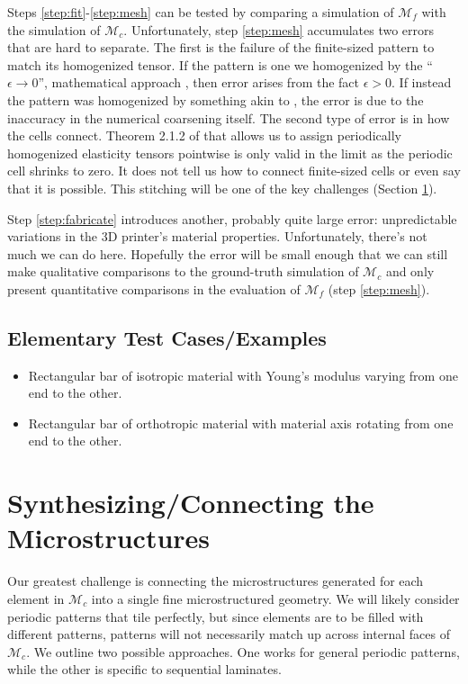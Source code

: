 \documentclass[10pt]{article}
\providecommand{\mesh}{\mathcal{M}}
\begin{document}
Steps \ref{step:fit}-\ref{step:mesh} can be tested by comparing a simulation of
$\mesh_f$ with the simulation of $\mesh_c$. Unfortunately, step \ref{step:mesh}
accumulates two errors that are hard to separate. The first is the failure of
the finite-sized pattern to match its homogenized tensor. If the pattern is one
we homogenized by the ``$\epsilon \to 0$'', mathematical approach
\cite{allaire2002shape}, then error arises from the fact $\epsilon > 0$. If
instead the pattern was homogenized by something akin to \cite{Kharevych2009},
the error is due to the inaccuracy in the numerical coarsening itself. The
second type of error is in how the cells connect. Theorem 2.1.2 of
\cite{allaire2002shape} that allows us to assign periodically homogenized
elasticity tensors pointwise is only valid in the limit as the periodic cell
shrinks to zero. It does not tell us how to connect finite-sized cells or even
say that it is possible. This stitching will be one of the key challenges
(Section \ref{sec:gen_connect}).

Step \ref{step:fabricate} introduces another, probably quite large error: unpredictable
variations in the 3D printer's material properties. Unfortunately, there's not
much we can do here. Hopefully the error will be small enough that we can still
make qualitative comparisons to the ground-truth simulation of $\mesh_c$ and
only present quantitative comparisons in the evaluation of $\mesh_f$ (step
\ref{step:mesh}).

\subsection{Elementary Test Cases/Examples}
\begin{itemize}
    \item Rectangular bar of isotropic material with Young's modulus varying from one end
        to the other.
    \item Rectangular bar of orthotropic material with material axis rotating
        from one end to the other.
\end{itemize}

\section{Synthesizing/Connecting the Microstructures}
\label{sec:gen_connect}
Our greatest challenge is connecting the microstructures generated for each
element in $\mesh_c$ into a single fine microstructured geometry. We will
likely consider periodic patterns that tile perfectly, but since elements are to
be filled with different patterns, patterns will not necessarily match up across
internal faces of $\mesh_c$. We outline two possible approaches. One works for
general periodic patterns, while the other is specific to sequential laminates.
\end{document}
